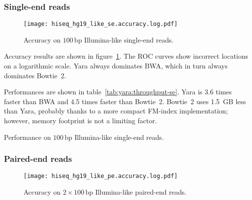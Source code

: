 \subsubsection{Single-end reads}

\begin{figure}[t]
\begin{center}
\caption[Yara accuracy on Illumina-like single-end reads]{Accuracy on $100\,\text{bp}$ Illumina-like single-end reads.}
\label{fig:yara:accuracy-se}
\texttt{[image: hiseq\_hg19\_like\_se.accuracy.log.pdf]}
\end{center}
\end{figure}

Accuracy results are shown in figure~\ref{fig:yara:accuracy-se}.
The ROC curves show incorrect locations on a logarithmic scale.
Yara always dominates BWA, which in turn always dominates Bowtie~2.

Performances are shown in table~\ref{tab:yara:throughput-se}.
Yara is 3.6 times faster than BWA and 4.5 times faster than Bowtie~2.
Bowtie~2 uses 1.5~GB less than Yara, probably thanks to a more compact FM-index implementation; however, memory footprint is not a limiting factor.

\begin{table}[b]
\begin{center}
\caption[Yara performance on Illumina-like single-end reads]{Performance on $100\,\text{bp}$ Illumina-like single-end reads.}
\sffamily

\label{tab:yara:throughput-se}
\end{center}
\end{table}

\subsubsection{Paired-end reads}

\begin{figure}[t]
\begin{center}
\caption[Yara accuracy on Illumina-like paired-end reads]{Accuracy on $2 \times 100\,\text{bp}$ Illumina-like paired-end reads.}
\label{fig:yara:accuracy-pe}
\texttt{[image: hiseq\_hg19\_like\_pe.accuracy.log.pdf]}
\end{center} 
\end{figure}

